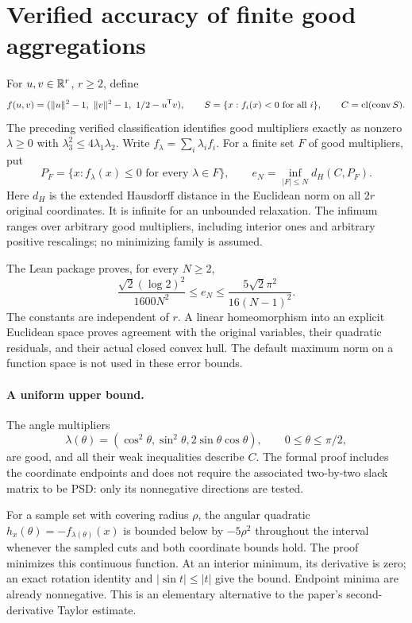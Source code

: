 \section{Verified accuracy of finite good aggregations}
\label{sec:formal-aggregation-accuracy}

For $u,v\in\mathbb R^r$, $r\geq2$, define
\[
 f(u,v)=(\|u\|^2-1,\ \|v\|^2-1,\ 1/2-u\transpose v),\qquad
 S=\{x:f_i(x)<0\text{ for all }i\},\qquad C=\cl(\conv S).
\]
The preceding verified classification identifies good multipliers exactly
as nonzero $\lambda\geq0$ with $\lambda_3^2\leq4\lambda_1\lambda_2$.
Write $f_\lambda=\sum_i\lambda_i f_i$. For a finite set $F$ of good
multipliers, put
\[
 P_F=\{x:f_\lambda(x)\leq0\text{ for every }\lambda\in F\},
 \qquad e_N=\inf_{|F|\leq N}d_H(C,P_F).
\]
Here $d_H$ is the extended Hausdorff distance in the Euclidean norm on all
$2r$ original coordinates. It is infinite for an unbounded relaxation.
The infimum ranges over arbitrary good multipliers, including interior
ones and arbitrary positive rescalings; no minimizing family is assumed.

The Lean package proves, for every $N\geq2$,
\[
 \frac{\sqrt2(\log2)^2}{1600N^2}
 \leq e_N\leq
 \frac{5\sqrt2\pi^2}{16(N-1)^2}.
\]
The constants are independent of $r$. A linear homeomorphism into an
explicit Euclidean space proves agreement with the original variables,
their quadratic residuals, and their actual closed convex hull. The
default maximum norm on a function space is not used in these error
bounds.

\paragraph{A uniform upper bound.}
The angle multipliers
\[
 \lambda(\theta)=(\cos^2\theta,\sin^2\theta,
                  2\sin\theta\cos\theta),\qquad 0\leq\theta\leq\pi/2,
\]
are good, and all their weak inequalities describe $C$. The formal proof
includes the coordinate endpoints and does not require the associated
two-by-two slack matrix to be PSD: only its nonnegative directions are
tested.

For a sample set with covering radius $\rho$, the angular quadratic
$h_x(\theta)=-f_{\lambda(\theta)}(x)$ is bounded below by $-5\rho^2$
throughout the interval whenever the sampled cuts and both coordinate
bounds hold. The proof minimizes this continuous function. At an interior
minimum, its derivative is zero; an exact rotation identity and
$|\sin t|\leq|t|$ give the bound. Endpoint minima are already nonnegative.
This is an elementary alternative to the paper's second-derivative
Taylor estimate.

